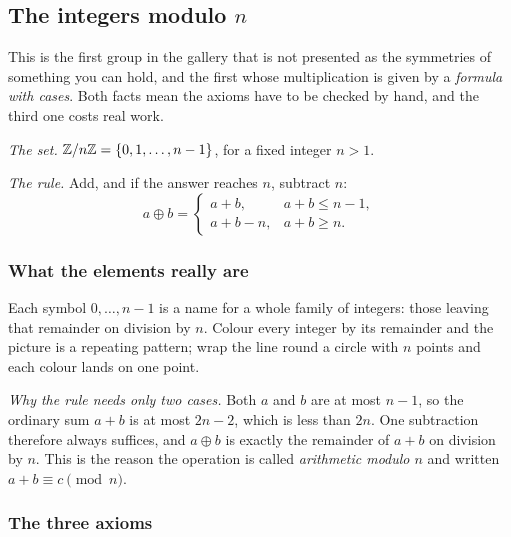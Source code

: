 \subsection{The integers modulo $n$}\label{sec:modn}

This is the first group in the gallery that is not presented as the symmetries of something you can
hold, and the first whose multiplication is given by a \emph{formula with cases}. Both facts mean
the axioms have to be checked by hand, and the third one costs real work.

\emph{The set.} $\mathbb{Z}/n\mathbb{Z}=\{0,1,\dots,n-1\}$, for a fixed integer $n>1$.

\emph{The rule.} Add, and if the answer reaches $n$, subtract $n$:
\[a\oplus b=\begin{cases} a+b, & a+b\le n-1,\\ a+b-n, & a+b\ge n.\end{cases}\]

\subsubsection*{What the elements really are}

Each symbol $0,\dots,n-1$ is a name for a whole family of integers: those leaving that remainder on
division by $n$. Colour every integer by its remainder and the picture is a repeating pattern; wrap
the line round a circle with $n$ points and each colour lands on one point.


\begin{why}
\emph{Why the rule needs only two cases.} Both $a$ and $b$ are at most $n-1$, so the ordinary sum
$a+b$ is at most $2n-2$, which is less than $2n$. One subtraction therefore always suffices, and
$a\oplus b$ is exactly the remainder of $a+b$ on division by $n$. This is the reason the operation
is called \emph{arithmetic modulo $n$} and written $a+b\equiv c \pmod n$.
\end{why}


\subsubsection*{The three axioms}


